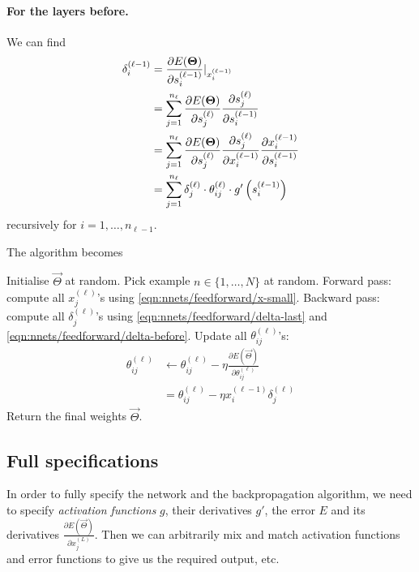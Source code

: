 \paragraph{For the layers before.} We can find
\begin{align}
    \delta_i^{(\ell - 1)}   &= \frac{\partial E(\boldsymbol{\mathbf{\Theta}})}{\partial s_i^{(\ell - 1)}}|_{x_i^{(\ell - 1)}} \\
                            &= \sum_{j = 1}^{n_\ell} \frac{\partial E(\boldsymbol{\mathbf{\Theta}})}{\partial s_j^{(\ell)}} \frac{\partial s_j^{(\ell)}}{\partial s_i^{(\ell - 1)}} \\
                            &= \sum_{j = 1}^{n_\ell} \frac{\partial E(\boldsymbol{\mathbf{\Theta}})}{\partial s_j^{(\ell)}} \frac{\partial s_j^{(\ell)}}{\partial x_i^{(\ell - 1)}} \frac{\partial x_i^{(\ell - 1)}}{\partial s_i^{(\ell - 1)}} \\
                            &= \sum_{j = 1}^{n_\ell} \delta_j^{(\ell)} \cdot \theta_{ij}^{(\ell)} \cdot g'\left(s_i^{(\ell - 1)}\right) \label{eqn:nnets/feedforward/delta-before}
\end{align}
recursively for $i = 1, \dotsc, n_{\ell - 1}$.

The algorithm becomes
\begin{algorithmbis}\label{alg:nnets/feedforward/backprop}
    \begin{algorithmic}[1]
        \State Initialise $\vec \Theta$ at random.
        \Repeat
            \State Pick example $n \in \{1, \dotsc, N\}$ at random.
            \State Forward pass: compute all $x_j^{(\ell)}$'s using \eqref{eqn:nnets/feedforward/x-small}.
            \State Backward pass: compute all $\delta_j^{(\ell)}$'s using \eqref{eqn:nnets/feedforward/delta-last} and \eqref{eqn:nnets/feedforward/delta-before}.
            \State Update all $\theta_{ij}^{(\ell)}$'s:
                \begin{align}
                    \theta_{ij}^{(\ell)}    &\leftarrow \theta_{ij}^{(\ell)} - \eta\frac{\partial E(\vec \Theta)}{\partial \theta_{ij}^{(\ell)}} \\
                                            &= \theta_{ij}^{(\ell)} - \eta x_i^{(\ell - 1)} \delta_j^{(\ell)}
                \end{align}
        \State Return the final weights $\vec \Theta$.
    \end{algorithmic}
\end{algorithmbis}

\subsection{Full specifications}
In order to fully specify the network and the backpropagation algorithm, we need to specify \emph{activation functions} $g$, their derivatives $g'$, the error $E$ and its derivatives $\frac{\partial E(\vec \Theta)}{\partial x_j^{(L)}}$. Then we can arbitrarily mix and match activation functions and error functions to give us the required output, etc.

